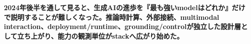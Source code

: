 \noindent\textbf{2024年後半を通して見ると、生成AIの進歩を『最も強いmodelはどれか』だけで説明することが難しくなった。推論時計算、外部接続、multimodal interaction、deployment/runtime、grounding/controlが独立した設計層として立ち上がり、能力の観測単位がstackへ広がり始めた。}\autocite{src-9cf289b414fd,src-bcbc025369e3}

